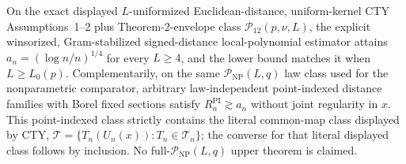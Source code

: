 On the exact displayed \(L\)-uniformized Euclidean-distance, uniform-kernel CTY Assumptions~1--2 plus Theorem-2-envelope class \(\mathcal P_{12}(p,\nu,L)\), the explicit winsorized, Gram-stabilized signed-distance local-polynomial estimator attains \(a_n=(\log n/n)^{1/4}\) for every \(L\geq4\), and the lower bound matches it when \(L\geq L_0(p)\).  Complementarily, on the same \(\mathcal P_{\mathrm{NP}}(L,q)\) law class used for the nonparametric comparator, arbitrary law-independent point-indexed distance families with Borel fixed sections satisfy \(R_n^{\mathrm{PI}}\gtrsim a_n\) without joint regularity in \(x\).  This point-indexed class strictly contains the literal common-map class displayed by CTY, \(\mathcal T=\{T_n(U_n(x)):T_n\in\mathcal T_n\}\); the converse for that literal displayed class follows by inclusion.  No full-\(\mathcal P_{\mathrm{NP}}(L,q)\) upper theorem is claimed.